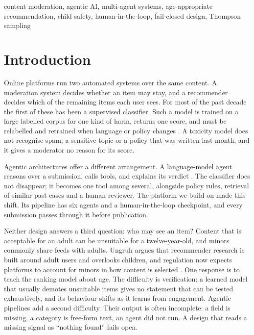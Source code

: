\documentclass[conference]{IEEEtran}
\begin{document}
\begin{IEEEkeywords}
content moderation, agentic AI, multi-agent systems, age-appropriate recommendation, child safety, human-in-the-loop, fail-closed design, Thompson sampling
\end{IEEEkeywords}

\section{Introduction}

Online platforms run two automated systems over the same content. A moderation system decides whether an item may stay, and a recommender decides which of the remaining items each user sees. For most of the past decade the first of these has been a supervised classifier. Such a model is trained on a large labelled corpus for one kind of harm, returns one score, and must be relabelled and retrained when language or policy changes \cite{gorwa2020algorithmic,kotarcic2022human}. A toxicity model does not recognise spam, a sensitive topic or a policy that was written last month, and it gives a moderator no reason for its score.

Agentic architectures offer a different arrangement. A language-model agent reasons over a submission, calls tools, and explains its verdict \cite{yao2023react,piot2025watched}. The classifier does not disappear; it becomes one tool among several, alongside policy rules, retrieval of similar past cases and a human reviewer. The platform we build on made this shift. Its pipeline has six agents and a human-in-the-loop checkpoint, and every submission passes through it before publication.

Neither design answers a third question: who may see an item? Content that is acceptable for an adult can be unsuitable for a twelve-year-old, and minors commonly share feeds with adults. Ungruh \cite{ungruh2025recommender} argues that recommender research is built around adult users and overlooks children, and regulation now expects platforms to account for minors in how content is selected \cite{coppa1998,ico2020aadc,eu2022dsa}. One response is to teach the ranking model about age. The difficulty is verification: a learned model that usually demotes unsuitable items gives no statement that can be tested exhaustively, and its behaviour shifts as it learns from engagement. Agentic pipelines add a second difficulty. Their output is often incomplete: a field is missing, a category is free-form text, an agent did not run. A design that reads a missing signal as ``nothing found'' fails open.
\end{document}
